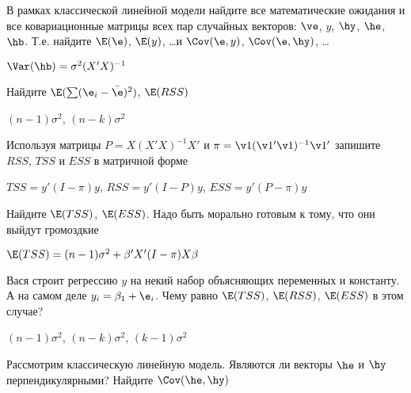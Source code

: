 \documentclass[pdftex,11pt,openany]{book}\usepackage[]{graphicx}\usepackage[]{color}
\begin{document}
\begin{problem}
В рамках классической линейной модели найдите все математические ожидания и все ковариационные матрицы всех пар случайных векторов: $\ve$, $y$, $\hy$, $\he$, $\hb$. Т.е. найдите $\E(\e)$, $\E(y)$, \ldots и $\Cov(\e,y)$, $\Cov(\e,\hy)$, \ldots
\end{problem}

\begin{solution}
$\Var(\hb)=\sigma^2 (X'X)^{-1}$
\end{solution}


\begin{problem}
Найдите $\E(\sum (\e_i-\bar{\e})^2 )$, $\E(RSS)$
\end{problem}

\begin{solution}
$(n-1)\sigma^2$, $(n-k)\sigma^2$
\end{solution}


\begin{problem}
Используя матрицы $P=X(X'X)^{-1}X'$ и $\pi=\v1(\v1'\v1)^{-1}\v1'$ запишите $RSS$, $TSS$ и $ESS$ в матричной форме
\end{problem}
\begin{solution}
$TSS=y'(I-\pi)y$, $RSS=y'(I-P)y$, $ESS=y'(P-\pi)y$ 
\end{solution}



\begin{problem}
Найдите $\E(TSS)$, $\E(ESS)$. Надо быть морально готовым к тому, что они выйдут громоздкие 
\end{problem}
\begin{solution}
$\E(TSS)=(n-1)\sigma^2+\beta'X'(I-\pi)X\beta$
\end{solution}


\begin{problem}
Вася строит регрессию $y$ на некий набор объясняющих переменных и константу. А на самом деле $y_i=\beta_1+\e_i$. Чему равно $\E(TSS)$, $\E(RSS)$, $\E(ESS)$ в этом случае?
\end{problem}

\begin{solution}
$(n-1)\sigma^2$, $(n-k)\sigma^2$, $(k-1)\sigma^2$
\end{solution}



\begin{problem}
Рассмотрим классическую линейную модель. Являются ли векторы $\he$ и $\hy$ перпендикулярными? Найдите $\Cov(\he,\hy)$
\end{problem}
\begin{solution}
\end{solution}
\end{document}
